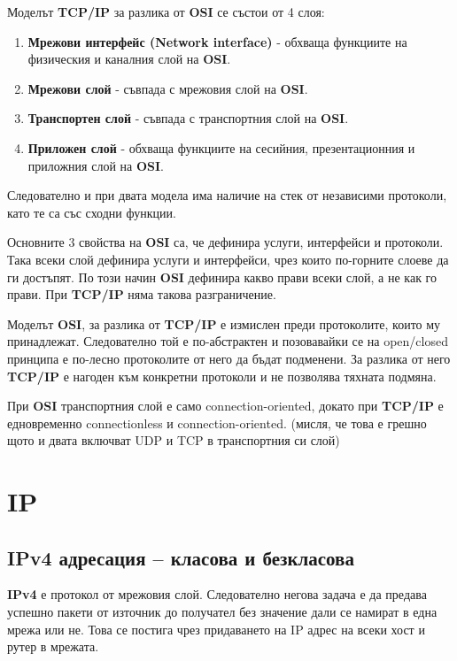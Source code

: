 \documentclass[fleqn,12pt]{article}
\begin{document}
\begin{flushleft}
Моделът \textbf{TCP/IP} за разлика от \textbf{OSI} се състои от 4 слоя:
\begin{enumerate}
    \item \textbf{Мрежови интерфейс (Network interface)} - обхваща функциите на физическия и каналния слой на \textbf{OSI}.
    \item \textbf{Мрежови слой} - съвпада с мрежовия слой на \textbf{OSI}.
    \item \textbf{Транспортен слой} - съвпада с транспортния слой на \textbf{OSI}.
    \item \textbf{Приложен слой} - обхваща функциите на сесийния, презентационния и приложния слой на \textbf{OSI}.
\end{enumerate}

Следователно и при двата модела има наличие на стек от независими протоколи, като те са със сходни функции.

Основните 3 свойства на \textbf{OSI} са, че дефинира услуги, интерфейси и протоколи. Така всеки слой дефинира услуги и интерфейси, чрез които по-горните слоеве да ги достъпят.
По този начин \textbf{OSI} дефинира какво прави всеки слой, а не как го прави. При \textbf{TCP/IP} няма такова разграничение.

Моделът \textbf{OSI}, за разлика от \textbf{TCP/IP} е измислен преди протоколите, които му принадлежат.
Следователно той е по-абстрактен и позовавайки се на open/closed принципа е по-лесно протоколите от него да бъдат подменени.
За разлика от него \textbf{TCP/IP} е нагоден към конкретни протоколи и не позволява тяхната подмяна.

При \textbf{OSI} транспортния слой е само connection-oriented, докато при \textbf{TCP/IP} е едновременно connectionless и connection-oriented. (мисля, че това е грешно щото и двата включват UDP и TCP в транспортния си слой)

\section{IP}

\subsection{IPv4 адресация – класова и безкласова}

\textbf{IPv4} е протокол от мрежовия слой. Следователно негова задача е да предава успешно пакети от източник до получател без значение дали се намират в една мрежа или не.
Това се постига чрез придаването на IP адрес на всеки хост и рутер в мрежата.


\end{flushleft}
\end{document}
